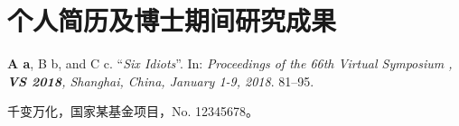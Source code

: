 \chapter{个人简历及博士期间研究成果}

\vspace{3pt}
\vspace{6pt}


\vspace{20pt}
\vspace{6pt}

\begin{enumerate}[label={[\arabic*]}]
	\item \textbf{A a}, B b,  and C c. “\textit{Six Idiots}”. In: \textit{Proceedings of the 66th Virtual Symposium , \textbf{VS 2018}, Shanghai, China, January 1-9, 2018}. 81–95.
\end{enumerate}

\vspace{20pt}
\vspace{6pt}

\begin{enumerate}[label={[\arabic*]}]
	\item 千变万化，国家某基金项目，No. 12345678。
\end{enumerate}
